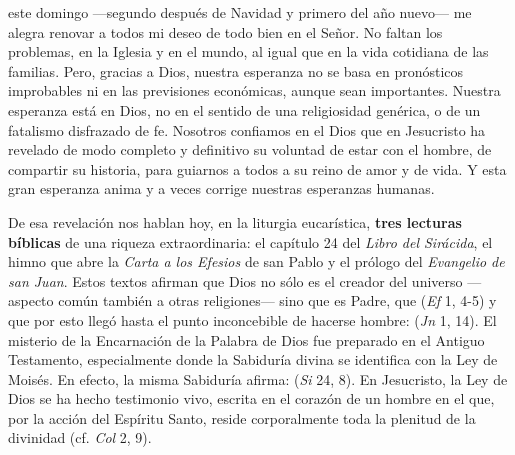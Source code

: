 \begin{body}
	 este domingo ---segundo después de Navidad y primero del año nuevo--- me alegra renovar a todos mi deseo de todo bien en el Señor. No faltan los problemas, en la Iglesia y en el mundo, al igual que en la vida cotidiana de las familias. Pero, gracias a Dios, nuestra esperanza no se basa en pronósticos improbables ni en las previsiones económicas, aunque sean importantes. Nuestra esperanza está en Dios, no en el sentido de una religiosidad genérica, o de un fatalismo disfrazado de fe. Nosotros confiamos en el Dios que en Jesucristo ha revelado de modo completo y definitivo su voluntad de estar con el hombre, de compartir su historia, para guiarnos a todos a su reino de amor y de vida. Y esta gran esperanza anima y a veces corrige nuestras esperanzas humanas.
	
	De esa revelación nos hablan hoy, en la liturgia eucarística, \textbf{tres lecturas bíblicas} de una riqueza extraordinaria: el capítulo 24 del \emph{Libro del Sirácida}, el himno que abre la \emph{Carta a los Efesios} de san Pablo y el prólogo del \emph{Evangelio de san Juan}. Estos textos afirman que Dios no sólo es el creador del universo ---aspecto común también a otras religiones--- sino que es Padre, que  (\emph{Ef} 1, 4-5) y que por esto llegó hasta el punto inconcebible de hacerse hombre:  (\emph{Jn} 1, 14). El misterio de la Encarnación de la Palabra de Dios fue preparado en el Antiguo Testamento, especialmente donde la Sabiduría divina se identifica con la Ley de Moisés. En efecto, la misma Sabiduría afirma:  (\emph{Si} 24, 8). En Jesucristo, la Ley de Dios se ha hecho testimonio vivo, escrita en el corazón de un hombre en el que, por la acción del Espíritu Santo, reside corporalmente toda la plenitud de la divinidad (cf. \emph{Col} 2, 9).
	

\end{body}
